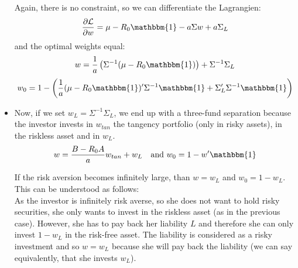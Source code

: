 \documentclass[10pt]{article}
\newenvironment{exercise}[2][Exercise]{\begin{trivlist}
  \item[\hskip \labelsep {\bfseries #1}\hskip \labelsep {\bfseries #2.}]}{\end{trivlist}}
\begin{document}
\begin{exercise}{1}
\begin{itemize}
    Again, there is no constraint, so we can differentiate the Lagrangien: 
    $$ \frac{\partial \mathcal{L}}{\partial w} = \mu -R_0\mathbbm{1} - a\Sigma w + a\Sigma_L$$ and the optimal weights equal:
    $$ w = \frac{1}{a}\left(\Sigma^{-1}(\mu-R_0\mathbbm{1})\right) + \Sigma^{-1}\Sigma_L $$
    $$ w_0 = 1 - \left(\frac{1}{a}(\mu-R_0\mathbbm{1})'\Sigma^{-1}\mathbbm{1} + \Sigma_L'\Sigma^{-1}\mathbbm{1}\right)$$

    \item Now, if we set $w_L = \Sigma^{-1}\Sigma_L$, we end up with a three-fund separation because the investor invests in $w_{tan}$ the tangency portfolio (only in risky assets), in the riskless asset and in $w_L$. 
    $$ w = \frac{B-R_0A}{a}w_{tan} + w_L \quad \text{and } w_0 = 1 - w'\mathbbm{1}$$

    If the risk aversion becomes infinitely large, than $w = w_L$ and $w_0 = 1 - w_L$. This can be understood as follows: 
    \\
    As the investor is infinitely risk averse, so she does not want to hold risky securities, she only wants to invest in the riskless asset (as in the previous case). However, she has to pay back her liability $L$ and therefore she can only invest $1 - w_L$ in the risk-free asset. The liability is considered as a risky investment and so $w = w_L$ because she will pay back the liability (we can say equivalently, that she invests $w_L$). 
  \end{itemize}
\end{exercise}
  
\end{document}
